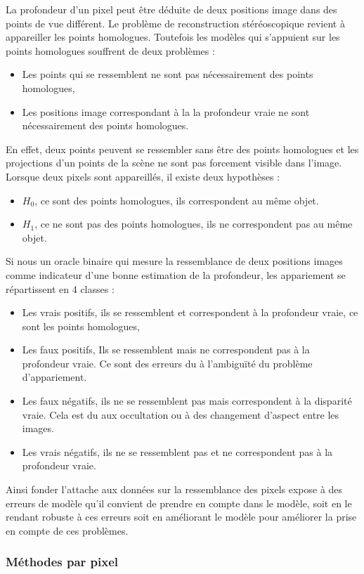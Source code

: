 \documentclass[../main/These_Mathias_Paget.tex]{subfiles}
\begin{document}
La profondeur d'un pixel peut être déduite de deux positions image dans des points de vue différent. Le problème de reconstruction stéréoscopique revient à appareiller les points homologues. Toutefois les modèles qui s’appuient sur les points homologues souffrent de deux problèmes :
\begin{itemize}
\item Les points qui se ressemblent ne sont pas nécessairement des points homologues,
\item Les positions image correspondant à la la profondeur vraie ne sont nécessairement des points homologues.
\end{itemize}
En effet, deux points peuvent se ressembler sans être des points homologues et les projections d'un points de la scène ne sont pas forcement visible dans l'image. Lorsque deux pixels sont appareillés, il existe deux hypothèses :
\begin{itemize}
\item $H_0$, ce sont des points homologues, ils correspondent au même objet. 
\item $H_1$, ce ne sont pas des points homologues, ils ne correspondent pas au même objet. 
\end{itemize}
Si nous un oracle binaire qui mesure la ressemblance de deux positions images comme indicateur d'une bonne estimation de la profondeur, les appariement se répartissent en 4 classes :
\begin{itemize}
\item Les vrais positifs, ils se ressemblent et correspondent à la profondeur vraie, ce sont les points homologues,
\item Les faux positifs, Ils se ressemblent mais ne correspondent pas à la profondeur vraie. Ce sont des erreurs du à l'ambiguïté du problème d'appariement.
\item Les faux négatifs, ils ne se ressemblent pas mais correspondent à la disparité vraie. Cela est du aux occultation ou à des changement d'aspect entre les images.
\item Les vrais négatifs, ils ne se ressemblent pas et ne correspondent pas à la profondeur vraie.
\end{itemize}
Ainsi fonder l'attache aux données sur la ressemblance des pixels expose à des erreurs de modèle qu'il convient de prendre en compte dans le modèle, soit en le rendant robuste à ces erreurs soit en améliorant le modèle pour améliorer la prise en compte de ces problèmes.

\subsubsection{Méthodes par pixel}
\end{document}
